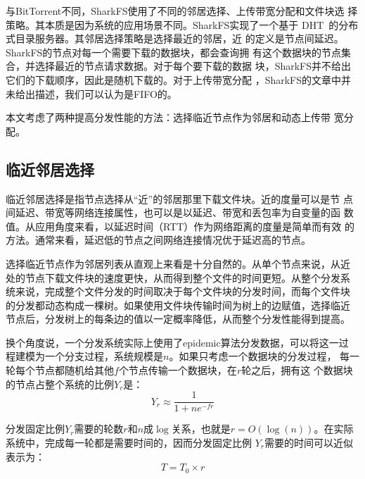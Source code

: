 与BitTorrent不同，SharkFS使用了不同的邻居选择、上传带宽分配和文件块选
择策略。其本质是因为系统的应用场景不同。SharkFS实现了一个基于
DHT~\cite{coral}的分布式目录服务器。其邻居选择策略是选择最近的邻居，近
的定义是节点间延迟。SharkFS的节点对每一个需要下载的数据块，都会查询拥
有这个数据块的节点集合，并选择最近的节点请求数据。对于每个要下载的数据
块，SharkFS并不给出它们的下载顺序，因此是随机下载的。对于上传带宽分配
，SharkFS的文章中并未给出描述，我们可以认为是FIFO的。

% 



本文考虑了两种提高分发性能的方法：选择临近节点作为邻居和动态上传带
宽分配。

\subsection{临近邻居选择}


临近邻居选择是指节点选择从“近”的邻居那里下载文件块。近的度量可以是节
点间延迟、带宽等网络连接属性，也可以是以延迟、带宽和丢包率为自变量的函
数值。从应用角度来看，以延迟时间（RTT）作为网络距离的度量是简单而有效
的方法。通常来看，延迟低的节点之间网络连接情况优于延迟高的节点。


选择临近节点作为邻居列表从直观上来看是十分自然的。从单个节点来说，从近
处的节点下载文件块的速度更快，从而得到整个文件的时间更短。从整个分发系
统来说，完成整个文件分发的时间取决于每个文件块的分发时间，而每个文件块
的分发都动态构成一棵树。如果使用文件块传输时间为树上的边赋值，选择临近
节点后，分发树上的每条边的值以一定概率降低，从而整个分发性能得到提高。

换个角度说，一个分发系统实际上使用了epidemic算法分发数据，可以将这一过
程建模为一个分支过程，系统规模是$n$。如果只考虑一个数据块的分发过程，
每一轮每个节点都随机给其他$f$个节点传输一个数据块，在$r$轮之后，拥有这
个数据块的节点占整个系统的比例$Y_r$是：
\begin{equation}
\label{equ:epidemic}
Y_r \approx \frac{1}{1+ne^{-fr}} 
\end{equation}

分发固定比例$Y_r$需要的轮数$r$和$n$成$\log$关系，也就是$r =
O(\log(n))$。在实际系统中，完成每一轮都是需要时间的，因而分发固定比例
$Y_r$需要的时间可以近似表示为：
\begin{equation}
T = T_0 \times r
\end{equation}

